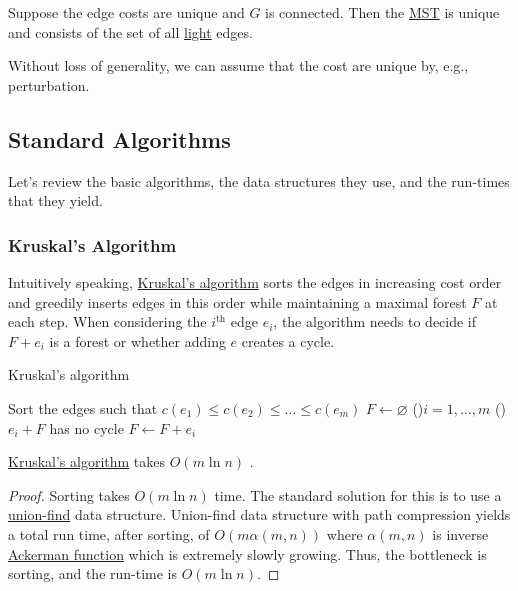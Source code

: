 \begin{corollary}
	Suppose the edge costs are unique and \(G\) is connected. Then the \hyperref[prb:MST]{MST} is unique and consists of the set of all \hyperref[def:light]{light} edges.
\end{corollary}

\begin{remark}
	Without loss of generality, we can assume that the cost are unique by, e.g., perturbation.
\end{remark}

\subsection{Standard Algorithms}
Let's review the basic algorithms, the data structures they use, and the run-times that they yield.

\subsubsection{Kruskal's Algorithm}
Intuitively speaking, \hyperref[algo:Kruskal]{Kruskal's algorithm} sorts the edges in increasing cost order and greedily inserts edges in this order while maintaining a maximal forest \(F\) at each step. When considering the \(i^{\text{th} }\) edge \(e_i\), the algorithm needs to decide if \(F + e_i\) is a forest or whether adding \(e\) creates a cycle.

\begin{algorithm}[H]\label{algo:Kruskal}
	\DontPrintSemicolon
	\caption{Kruskal's algorithm}
	\BlankLine

	Sort the edges such that \(c(e_1) \leq c(e_2) \leq \dots \leq c(e_m)\)
	\(F \gets \varnothing \)\;
	\For(){\(i = 1, \dots  , m\)}{
		\If(){\(e_i + F\) has no cycle}{
			\(F \gets F + e_i\)\;
		}
	}
	\;
\end{algorithm}

\begin{lemma}\label{lma:Kruskal}
	\hyperref[algo:Kruskal]{Kruskal's algorithm} takes \(O(m \ln n)\) .
\end{lemma}
\begin{proof}
	Sorting takes \(O(m \ln n)\) time. The standard solution for this is to use a \href{https://en.wikipedia.org/wiki/Disjoint-set_data_structure}{union-find} data structure. Union-find data structure with path compression yields a total run time, after sorting, of \(O(m \alpha (m, n))\) where \(\alpha (m, n)\) is inverse \href{https://en.wikipedia.org/wiki/Ackermann_function}{Ackerman function} which is extremely slowly growing. Thus, the bottleneck is sorting, and the run-time is \(O(m \ln n)\).
\end{proof}


